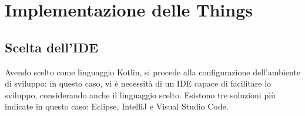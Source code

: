 \documentclass[12pt,a4paper,openright,oneside]{report}
\begin{document}

\clearpage{\pagestyle{empty}\cleardoublepage}
\chapter{Implementazione delle Things}           %
\lhead[\fancyplain{}{\bfseries\thepage}]{\fancyplain{}{\bfseries\rightmark}}  

\section{Scelta dell'IDE}
Avendo scelto come linguaggio Kotlin, si procede alla configurazione dell'ambiente di sviluppo: in questo caso, vi è necessità di un IDE capace di facilitare lo sviluppo, considerando anche il linguaggio scelto. Esistono tre soluzioni più indicate in questo caso: Eclipse, IntelliJ e Visual Studio Code.\\
\end{document}
